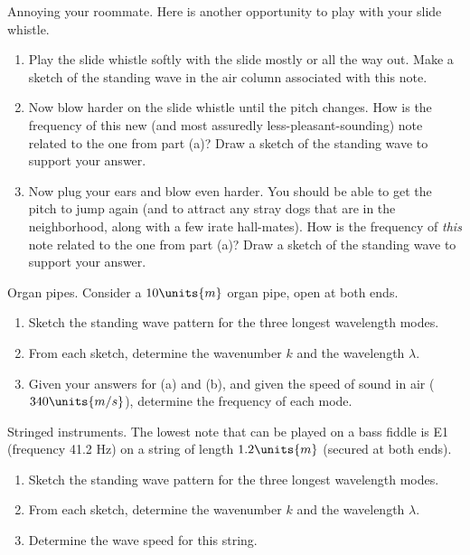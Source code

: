 \begin{aproblem}{Annoying your roommate.} 
  Here is another opportunity to play with your slide whistle.
  \begin{enumerate}
  \item Play the slide whistle softly with the slide mostly or all the
    way out.  Make a sketch of the standing wave in the air column
    associated with this note.
  \item Now blow harder on the slide whistle until the pitch changes.
    How is the frequency of this new (and most assuredly
    less-pleasant-sounding) note related to the one from part (a)?
    Draw a sketch of the standing wave to support your answer.
  \item Now plug your ears and blow even harder.  You should be able
    to get the pitch to jump again (and to attract any stray dogs that
    are in the neighborhood, along with a few irate hall-mates). How
    is the frequency of {\it this} note related to the one from part
    (a)?  Draw a sketch of the standing wave to support your answer.
  \end{enumerate}
\end{aproblem}

\newpage

\begin{aproblem}{Organ pipes.}  
  Consider a $10\units{m}$ organ pipe, open at both ends.
  \begin{enumerate}
  \item Sketch the standing wave pattern for the three longest
    wavelength modes.
  \item From each sketch, determine the wavenumber $k$ and the
    wavelength $\lambda$.
  \item Given your answers for (a) and (b), and given the speed of
    sound in air ($340\units{m/s}$), determine the frequency of each
    mode.
  \end{enumerate}
  \label{prob:OrganPipes}
\end{aproblem}


\begin{aproblem}{Stringed instruments.} 
  The lowest note that can be played on a bass fiddle is E1 (frequency
  41.2 Hz) on a string of length $1.2\units{m}$ (secured at both
  ends).
  \begin{enumerate}
  \item Sketch the standing wave pattern for the three longest
    wavelength modes.
  \item From each sketch, determine the wavenumber $k$ and the
    wavelength $\lambda$.
  \item Determine the wave speed for this string.
  \end{enumerate}
\end{aproblem}


